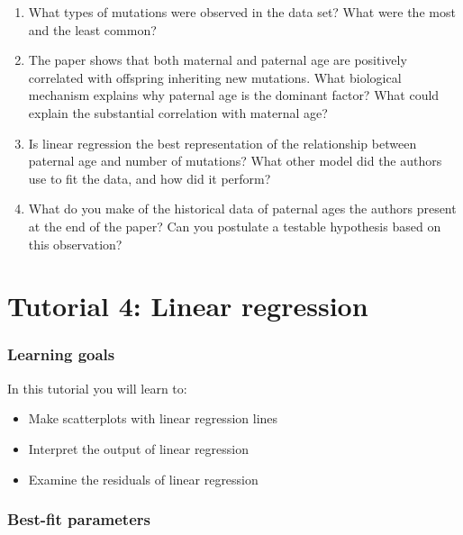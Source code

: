 \documentclass[
  letterpaper,
  DIV=11,
  numbers=noendperiod]{scrreprt}
\providecommand{\tightlist}{%
  \setlength{\itemsep}{0pt}\setlength{\parskip}{0pt}}\usepackage{longtable,booktabs,array}
\begin{document}
\begin{enumerate}
\def\labelenumi{\arabic{enumi}.}
\item
  What types of mutations were observed in the data set? What were the
  most and the least common?
\item
  The paper shows that both maternal and paternal age are positively
  correlated with offspring inheriting new mutations. What biological
  mechanism explains why paternal age is the dominant factor? What could
  explain the substantial correlation with maternal age?
\item
  Is linear regression the best representation of the relationship
  between paternal age and number of mutations? What other model did the
  authors use to fit the data, and how did it perform?
\item
  What do you make of the historical data of paternal ages the authors
  present at the end of the paper? Can you postulate a testable
  hypothesis based on this observation?
\end{enumerate}


\hypertarget{tutorial-4-linear-regression}{%
\chapter*{Tutorial 4: Linear
regression}\label{tutorial-4-linear-regression}}


\hypertarget{learning-goals-3}{%
\subsection*{Learning goals}\label{learning-goals-3}}

In this tutorial you will learn to:

\begin{itemize}
\tightlist
\item
  Make scatterplots with linear regression lines
\item
  Interpret the output of linear regression
\item
  Examine the residuals of linear regression
\end{itemize}

\hypertarget{best-fit-parameters}{%
\subsection*{Best-fit parameters}\label{best-fit-parameters}}
\end{document}
